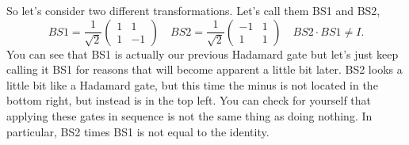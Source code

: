 So let's consider two different transformations. Let's call them BS1 and BS2,
\begin{equation}
B S 1=\frac{1}{\sqrt{2}}\left(\begin{array}{cc}
1 & 1 \\
1 & -1
\end{array}\right) \quad B S 2=\frac{1}{\sqrt{2}}\left(\begin{array}{cc}
-1 & 1 \\
1 & 1
\end{array}\right) \quad B S 2 \cdot B S 1 \neq I.
\end{equation}
You can see that BS1 is actually our previous Hadamard gate but let's just keep calling it BS1 for reasons that will become apparent a little bit later.  BS2 looks a little bit  like a Hadamard gate, but this time the minus is not located in the bottom right, but instead is in the top left. You can check for yourself that applying these gates in sequence is not the same thing as doing nothing. In particular, BS2 times BS1 is not equal to the identity.

